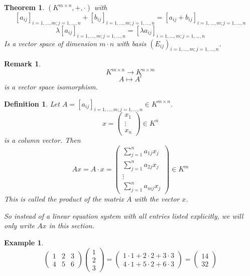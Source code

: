 \documentclass[a4paper,landscape,twocolumn]{article}
\newtheorem{theorem}{Theorem}[section]
\newtheorem{defi}{Definition}[section]
\newtheorem{ex}{Example}[section]
\newtheorem{rem}{Remark}[section]
\begin{document}
\begin{theorem}
  \label{satz-6-2}
  $(K^{m\times n}, +, \cdot)$ with
  \[
    [a_{ij}]_{i=1,\dots,m; j=1,\dots,n} + [b_{ij}]_{i=1,\dots,m; j=1,\dots,n}
    = [a_{ij} + b_{ij}]_{i=1,\dots,m; j=1,\dots,n}
  \] \[
    \lambda [a_{ij}]_{i=1,\dots,m; j=1,\dots,n}
    = [\lambda a_{ij}]_{i=1,\dots,m; j=1,\dots,n}
  \]
  Is a vector space of dimension $m \cdot n$ with basis $(E_{ij})_{i=1,\dots,m;j=1,\dots,n}$.
\end{theorem}
%
\begin{rem}
  \label{bemerkung-6-3}
  \[ K^{m\times n} \rightarrow K^{n\times m} \]
  \[ A \mapsto A^t \]
  is a vector space isomorphism.
\end{rem}
%
\begin{defi}
  Let $A = [a_{ij}]_{i=1,\dots,m;j=1,\dots,n} \in K^{m\times n}$.
  \[ x = \begin{pmatrix} x_1 \\ \vdots \\ x_n \end{pmatrix} \in K^n \]
  is a column vector. Then
  \[
    Ax = A \cdot x = \begin{pmatrix}
      \sum_{j=1}^n a_{1j} x_j \\
      \sum_{j=1}^n a_{2j} x_j \\
      \vdots \\
      \sum_{j=1}^n a_{mj} x_j
    \end{pmatrix}
    \in K^m
  \]
  This is called the product of the matrix $A$ with the vector $x$.

  So instead of a linear equation system with all entries listed explicitly,
  we will only write $Ax$ in this section.
\end{defi}
%
\begin{ex}
  \[
    \begin{pmatrix}
      1 & 2 & 3 \\
      4 & 5 & 6
    \end{pmatrix}
    \begin{pmatrix}
      1 \\ 2 \\ 3
    \end{pmatrix}
    = \begin{pmatrix}
      1 \cdot 1 + 2 \cdot 2 + 3 \cdot 3 \\
      4 \cdot 1 + 5 \cdot 2 + 6 \cdot 3
    \end{pmatrix}
    = \begin{pmatrix}
      14 \\ 32
    \end{pmatrix}
  \]
\end{ex}
\end{document}
